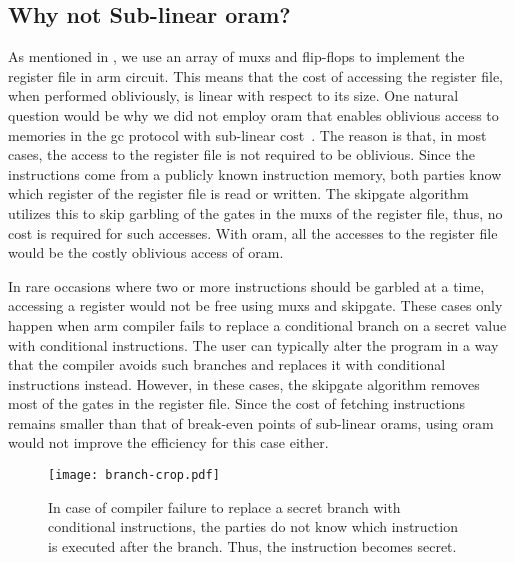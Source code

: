 \subsection{Why not Sub-linear \acrshort{oram}?}
As mentioned in , we use an array of \acrshort{mux}s and flip-flops to implement the register file in \gls{arm} circuit.
This means that the cost of accessing the register file, when performed obliviously, is linear with respect to its size.
One natural question would be why we did not employ \acrfull{oram} that enables oblivious access to memories in the \acrshort{gc} protocol with sub-linear cost~\cite{wang2014scoram, zahur2016revisit}.
The reason is that, in most cases, the access to the register file is not required to be oblivious.
Since the instructions come from a publicly known instruction memory, both parties know which register of the register file is read or written.
The \gls{skipgate} algorithm utilizes this to skip garbling of the gates in the \acrshort{mux}s of the register file, thus, no cost is required for such accesses.
With \acrshort{oram}, all the accesses to the register file would be the costly oblivious access of \acrshort{oram}.

In rare occasions where two or more instructions should be garbled at a time, accessing a register would not be free using \acrshort{mux}s and \gls{skipgate}.
These cases only happen when \gls{arm} compiler fails to replace a conditional branch on a secret value with conditional instructions.
The user can typically alter the program in a way that the compiler avoids such branches and replaces it with conditional instructions instead.
However, in these cases, the \gls{skipgate} algorithm removes most of the gates in the register file.
Since the cost of fetching instructions remains smaller than that of break-even points of sub-linear \acrshort{oram}s, using \acrshort{oram} would not improve the efficiency for this case either.

\begin{figure}[h]
\centering
\texttt{[image: branch-crop.pdf]}
\caption{In case of compiler failure to replace a secret branch with conditional instructions, the parties do not know which instruction is executed after the branch.
Thus, the instruction becomes secret.}
\label{fig:branch}
\end{figure}

